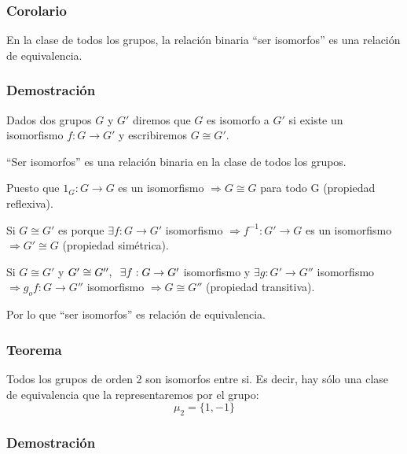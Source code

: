 \documentclass[11pt,a4paper]{article}
\begin{document}
\subsubsection*{Corolario}

En la clase de todos los grupos, la relación binaria ``ser isomorfos'' es una relación de equivalencia.

\subsubsection*{Demostración}

Dados dos grupos $G$ y $G'$ diremos que $G$ es isomorfo a $G'$ si existe un isomorfismo $f: G \to G'$ y escribiremos $G \cong G'$.

``Ser isomorfos'' es una relación binaria en la clase de todos los grupos.

Puesto que $1_{G}: G \to G$ es un isomorfismo $\Rightarrow G \cong G$ para todo G (propiedad reflexiva).

Si $G \cong G'$ es porque $\exists f: G \to G'$ isomorfismo $\Rightarrow f^{-1}: G' \to G$ es un isomorfismo $\Rightarrow G' \cong G$ (propiedad simétrica).

Si $G \cong G'$ y $G' \cong G'', \hspace{0.2cm} \exists f: G \to G'$ isomorfismo y $\exists g: G' \to G''$ isomorfismo $\Rightarrow g_{o}f: G \to G''$ isomorfismo $\Rightarrow G \cong G''$ (propiedad transitiva).

Por lo que ``ser isomorfos'' es relación de equivalencia.


\subsubsection*{Teorema}

Todos los grupos de orden 2 son isomorfos entre si. Es decir, hay sólo una clase de equivalencia que la representaremos por el grupo:
$$\mu_{2} = \{1,-1\}$$

\subsubsection*{Demostración}
\end{document}
